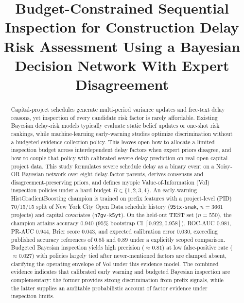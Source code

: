 \documentclass[journal]{IEEEtran}
\begin{document}
\title{Budget-Constrained Sequential Inspection for Construction Delay Risk Assessment Using a Bayesian Decision Network With Expert Disagreement}

\author{
}

\maketitle

\begin{abstract}
Capital-project schedules generate multi-period variance updates and free-text delay reasons, yet inspection of every candidate risk factor is rarely affordable. Existing Bayesian delay-risk models typically evaluate static belief updates or one-shot risk rankings, while machine-learning early-warning studies optimize discrimination without a budgeted evidence-collection policy. This leaves open how to allocate a limited inspection budget across interdependent delay factors when expert priors disagree, and how to couple that policy with calibrated severe-delay prediction on real open capital-project data. This study formulates severe schedule delay as a binary event on a Noisy-OR Bayesian network over eight delay-factor parents, derives consensus and disagreement-preserving priors, and defines myopic Value-of-Information (VoI) inspection policies under a hard budget $B\in\{1,2,3,4\}$. An early-warning HistGradientBoosting champion is trained on prefix features with a project-level (PID) 70/15/15 split of New York City Open Data schedule history (\texttt{95tx-snak}, $n{=}3661$ projects) and capital covariates (\texttt{n7gv-k5yt}). On the held-out TEST set ($n{=}550$), the champion attains accuracy $0.940$ (95\% bootstrap CI $[0.922,0.958]$), ROC-AUC $0.981$, PR-AUC $0.944$, Brier score $0.043$, and expected calibration error $0.030$, exceeding published accuracy references of $0.85$ and $0.89$ under a explicitly scoped comparison. Budgeted Bayesian inspection yields high precision (${\approx}0.81$) at low false-positive rate (${\approx}0.027$) with policies largely tied after never-mentioned factors are clamped absent, clarifying the operating envelope of VoI under this evidence model. The combined evidence indicates that calibrated early warning and budgeted Bayesian inspection are complementary: the former provides strong discrimination from prefix signals, while the latter supplies an auditable probabilistic account of factor evidence under inspection limits.
\end{abstract}
\end{document}
